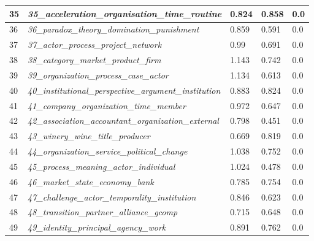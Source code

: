 \documentclass[12pt]{article}
\begin{document}
\begin{longtable}{|l|l|l|l|l|}
35 & \textit{35\_acceleration\_organisation\_time\_routine} & 0.824 & 0.858 & 0.0 \\ \hline
36 & \textit{36\_paradox\_theory\_domination\_punishment} & 0.859 & 0.591 & 0.0 \\ \hline
37 & \textit{37\_actor\_process\_project\_network} & 0.99 & 0.691 & 0.0 \\ \hline
38 & \textit{38\_category\_market\_product\_firm} & 1.143 & 0.742 & 0.0 \\ \hline
39 & \textit{39\_organization\_process\_case\_actor} & 1.134 & 0.613 & 0.0 \\ \hline
40 & \textit{40\_institutional\_perspective\_argument\_institution} & 0.883 & 0.824 & 0.0 \\ \hline
41 & \textit{41\_company\_organization\_time\_member} & 0.972 & 0.647 & 0.0 \\ \hline
42 & \textit{42\_association\_accountant\_organization\_external} & 0.798 & 0.451 & 0.0 \\ \hline
43 & \textit{43\_winery\_wine\_title\_producer} & 0.669 & 0.819 & 0.0 \\ \hline
44 & \textit{44\_organization\_service\_political\_change} & 1.038 & 0.752 & 0.0 \\ \hline
45 & \textit{45\_process\_meaning\_actor\_individual} & 1.024 & 0.478 & 0.0 \\ \hline
46 & \textit{46\_market\_state\_economy\_bank} & 0.785 & 0.754 & 0.0 \\ \hline
47 & \textit{47\_challenge\_actor\_temporality\_institution} & 0.846 & 0.623 & 0.0 \\ \hline
48 & \textit{48\_transition\_partner\_alliance\_gcomp} & 0.715 & 0.648 & 0.0 \\ \hline
49 & \textit{49\_identity\_principal\_agency\_work} & 0.891 & 0.762 & 0.0 \\ \hline
\end{longtable}
\onecolumn
\end{document}
